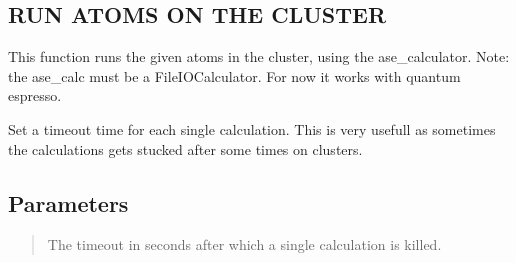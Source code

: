 \documentclass[a4paper,11pt,english]{sphinxmanual}
\begin{document}
\begin{fulllineitems}
\begin{fulllineitems}
\label{\detokenize{apireference:sscha.Cluster.Cluster.run_atoms}}
\pysigstartsignatures
{}
\pysigstopsignatures

\subsection{RUN ATOMS ON THE CLUSTER}
\label{\detokenize{apireference:run-atoms-on-the-cluster}}
\sphinxAtStartPar
This function runs the given atoms in the cluster, using the ase\_calculator.
Note: the ase\_calc must be a FileIOCalculator. 
For now it works with quantum espresso.

\end{fulllineitems}


\begin{fulllineitems}
\label{\detokenize{apireference:sscha.Cluster.Cluster.set_timeout}}
\pysigstartsignatures
{}
\pysigstopsignatures
\sphinxAtStartPar
Set a timeout time for each single calculation.
This is very usefull as sometimes the calculations gets stucked after some times on clusters.


\subsection{Parameters}
\label{\detokenize{apireference:id62}}\begin{quote}
\begin{description}
\sphinxAtStartPar
The timeout in seconds after which a single calculation is killed.

\end{description}
\end{quote}


\end{fulllineitems}
\end{fulllineitems}
\end{document}

